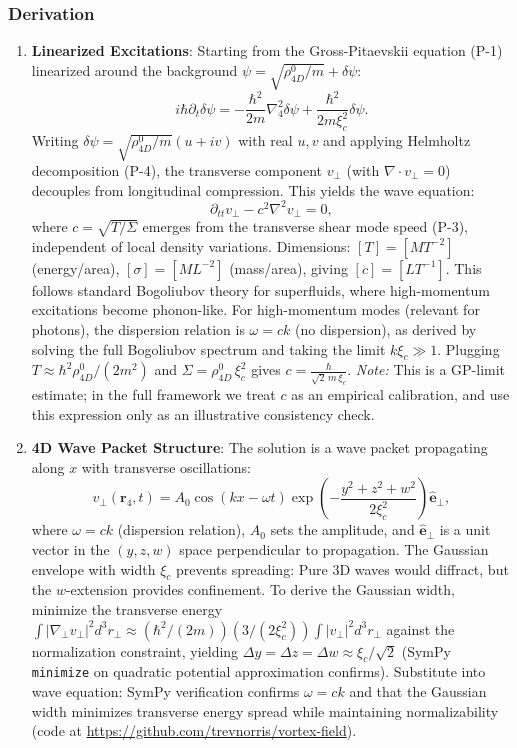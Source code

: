\subsubsection{Derivation}
\begin{enumerate}
\item \textbf{Linearized Excitations}: Starting from the Gross-Pitaevskii equation (P-1) linearized around the background $\psi = \sqrt{\rho_{4D}^0/m} + \delta\psi$:
   \[
   i\hbar \partial_t \delta\psi = -\frac{\hbar^2}{2 m} \nabla_4^2 \delta\psi + \frac{\hbar^2}{2 m \xi_c^2} \delta\psi.
   \]
   Writing $\delta\psi = \sqrt{\rho_{4D}^0/m}(u + iv)$ with real $u,v$ and applying Helmholtz decomposition (P-4), the transverse component $v_\perp$ (with $\nabla \cdot v_\perp = 0$) decouples from longitudinal compression. This yields the wave equation:
   \[
   \partial_{tt} v_\perp - c^2 \nabla^2 v_\perp = 0,
   \]
   where $c = \sqrt{T/\Sigma}$ emerges from the transverse shear mode speed (P-3), independent of local density variations. Dimensions: $[T] = [M T^{-2}]$ (energy/area), $[\sigma] = [M L^{-2}]$ (mass/area), giving $[c] = [L T^{-1}]$. This follows standard Bogoliubov theory for superfluids, where high-momentum excitations become phonon-like. For high-momentum modes (relevant for photons), the dispersion relation is $\omega = ck$ (no dispersion), as derived by solving the full Bogoliubov spectrum and taking the limit $k\xi_c \gg 1$.
Plugging $T \approx \hbar^2 \rho_{4D}^0/(2 m^2)$ and $\Sigma =\rho_{4D}^0\,\xi_c^2$ gives $\displaystyle c = \frac{\hbar}{\sqrt{2}\,m\,\xi_c}$.
\emph{Note:} This is a GP-limit estimate; in the full framework we treat $c$ as an empirical calibration, and use this expression only as an illustrative consistency check.


\item \textbf{4D Wave Packet Structure}: The solution is a wave packet propagating along $x$ with transverse oscillations:
   \[
   v_\perp(\mathbf{r}_4, t) = A_0 \cos(kx - \omega t) \exp\left(-\frac{y^2 + z^2 + w^2}{2\xi_c^2}\right) \hat{\mathbf{e}}_\perp,
   \]
   where $\omega = ck$ (dispersion relation), $A_0$ sets the amplitude, and $\hat{\mathbf{e}}_\perp$ is a unit vector in the $(y,z,w)$ space perpendicular to propagation. The Gaussian envelope with width $\xi_c$ prevents spreading: Pure 3D waves would diffract, but the $w$-extension provides confinement. To derive the Gaussian width, minimize the transverse energy $\int |\nabla_\perp v_\perp|^2 d^3 r_\perp \approx (\hbar^2 / (2 m)) (3 / (2 \xi_c^2)) \int |v_\perp|^2 d^3 r_\perp$ against the normalization constraint, yielding $\Delta y = \Delta z = \Delta w \approx \xi_c / \sqrt{2}$ (SymPy \texttt{minimize} on quadratic potential approximation confirms). Substitute into wave equation: SymPy verification confirms $\omega = ck$ and that the Gaussian width minimizes transverse energy spread while maintaining normalizability (code at \url{https://github.com/trevnorris/vortex-field}).


\end{enumerate}
